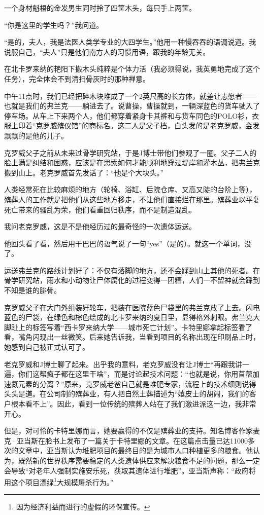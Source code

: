 \documentclass[12pt,oneside]{book}
\begin{document}
\begin{bookref}[frametitle={\cite{好好告别：世界葬礼观察手记}}]
一个身材魁梧的金发男生同时拎了四筐木头，每只手上两筐。

“你是这里的学生吗？”我问道。

“是的，夫人，我是法医人类学专业的大四学生。”他用一种慢吞吞的语调说道。我说服自己，“夫人”只是他们南方人的习惯用语，跟我的年龄无关。

在北卡罗来纳的艳阳下搬木头纯粹是个体力活（我必须得说，我英勇地完成了这个任务），完全体会不到清扫骨灰时的那种禅意。

中午11点时，我们已经把碎木块堆成了一个2英尺高的长方体，就差让志愿者——也就是我们的弗兰克——躺进去了。说曹操，曹操就到，一辆深蓝色的货车驶入了停车场。从车上下来两个人，他们都穿着紧身卡其裤和与货车同色的POLO衫，衣服上印着“克罗威殡仪馆”的商标名。这二人是父子档，白头发的是老克罗威，金发飘飘的是他的儿子。

克罗威父子之前从未来过骨学研究站，于是J博士带他们参观了一圈。父子二人的脸上满是纠结和困惑，应该是在思索如何才能顺利地穿过堤岸和灌木丛，把弗兰克搬到山上。老克罗威首先发话了：“他是个大块头。”

人类经常死在比较麻烦的地方（轮椅、浴缸、后院仓库、又高又陡的台阶上等），殡葬人的工作就是把他们从这些地方移走，不让他们直接烂在那里。殡葬业以平复死亡带来的骚乱为荣，他们看重回归秩序，而不是制造混乱。

我问老克罗威，这是不是他经历过的最奇怪的一次遗体运送。

他回头看了看，然后用干巴巴的语气说了一句“yes”（是的）。就这一个单词，没了。

运送弗兰克的路线计划好了：不仅有落脚的地方，还不会踩到山上其他的死者。在骨学研究站，雨水和小动物让尸体腐化的过程变得一团糟，人们一不留神就会踩到不知是谁的腓骨。

克罗威父子在大门外组装好轮车，把装在医院蓝色尸袋里的弗兰克放了上去。闪电蓝色的尸袋，在绿色和棕色绘成的北卡罗来纳的夏日里，显得格外刺眼。弗兰克大脚趾上的标签写着“西卡罗来纳大学——城市死亡计划”。卡特里娜拿起标签看了看，嘴角闪现出一丝微笑。后来她告诉我，当看到项目的名称出现在印刷品上时，她感到自己被正式认可了。

老克罗威和J博士聊了起来。出乎我的意料，老克罗威没有让J博士“再跟我讲一遍，你们这帮疯子都在这里干啥”，而是讨论起技术问题：“也就是说，你用苜蓿加速氮元素的分离？”原来，克罗威老爸自己就是堆肥专家，流程上的技术细则说得头头是道。在公司制的殡葬业，有人把自然土葬描述为“嬉皮士的胡闹，我们的客户根本看不上”。因此，看到一位传统的殡葬人站在了我们激进派这一边，我非常开心。

但是，对可怜的卡特里娜而言，她要赢得的不仅是殡葬业的支持。知名博客作家麦克·亚当斯在脸书上发布了一篇关于卡特里娜的文章。在这篇点击量已达11000多次的文章中，亚当斯认为堆肥项目的最终目的是为城市人口种植更多的粮食。他认为，既然新的世界秩序需要稳定的人类遗体供应来解决粮食不足的问题，那么一定会导致“对老年人强制实施安乐死，获取其遗体进行堆肥”。亚当斯声称：“政府将用这个项目漂绿\footnote{因为经济利益而进行的虚假的环保宣传。}大规模屠杀行为。”


\end{bookref}
\end{document}
